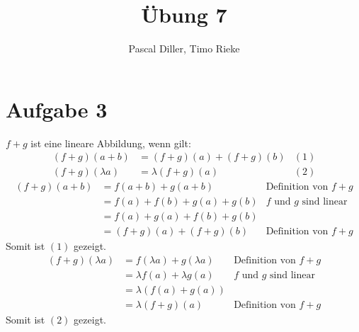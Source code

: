 \documentclass{article}
\title{Übung 7}
\author{Pascal Diller, Timo Rieke}
\begin{document}
\maketitle

\section{Aufgabe 3}
$f+g$ ist eine lineare Abbildung, wenn gilt:
\begin{align*}
    (f+g)(a+b) &= (f+g)(a)+(f+g)(b) & (1) \\
    (f+g)(\lambda a) &= \lambda(f+g)(a) & (2)
\end{align*}
\newline
\begin{align*}
    (f+g)(a+b) &= f(a+b)+g(a+b) &\text{Definition von $f+g$}\\
    &= f(a)+f(b) + g(a)+g(b) &\text{$f$ und $g$ sind linear}\\
    &= f(a)+g(a) + f(b) + g(b) \\
    &= (f+g)(a) + (f+g)(b) &\text{Definition von $f+g$}
\end{align*}
Somit ist $(1)$ gezeigt. \\
\newline
\begin{align*}
    (f+g)(\lambda a) &= f(\lambda a) + g(\lambda a) &\text{Definition von $f+g$} \\
    &= \lambda f(a) + \lambda g(a) & \text{$f$ und $g$ sind linear} \\
    &= \lambda(f(a)+g(a)) \\
    &= \lambda(f+g)(a) & \text{Definition von $f+g$}
\end{align*}
Somit ist $(2)$ gezeigt. \\
\end{document}
